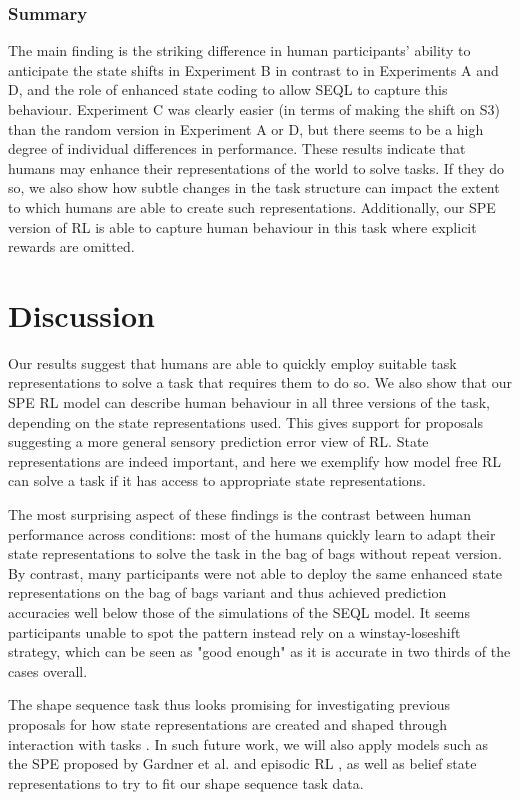 \documentclass[10pt,letterpaper]{article}
\begin{document}
\subsubsection{Summary} The main finding is the striking difference in human participants' ability to anticipate the state shifts in Experiment B in contrast to in Experiments A and D, and the role of enhanced state coding to allow SEQL to capture this behaviour. Experiment C was clearly easier (in terms of making the shift on S3) than the random version in Experiment A or D, but there seems to be a high degree of individual differences in performance. These results indicate that humans may enhance their representations of the world to solve tasks. If they do so, we also show how subtle changes in the task structure can impact the extent to which humans are able to create such representations. Additionally, our SPE version of RL is able to capture human behaviour in this task where explicit rewards are omitted.

\section{Discussion}

Our results suggest that humans are able to quickly employ suitable task representations to solve a task that requires them to do so. We also show that our SPE RL model can describe human behaviour in all three versions of the task, depending on the state representations used. This gives support for proposals suggesting a more general sensory prediction error view of RL. State representations are indeed important, and here we exemplify how model free RL can solve a task if it has access to appropriate state representations.

The most surprising aspect of these findings is the contrast between human performance across conditions: most of the humans quickly learn to adapt their state representations to solve the task in the bag of bags without repeat version. By contrast, many participants were not able to deploy the same enhanced state representations on the bag of bags variant and thus achieved prediction accuracies well below those of the simulations of the SEQL model. It seems participants unable to spot the pattern instead rely on a winstay-loseshift strategy, which can be seen as "good enough" as it is accurate in two thirds of the cases overall.

The shape sequence task thus looks promising for investigating previous proposals for how state representations are created and shaped through interaction with tasks \cite{Collins2013-cv,Eckstein2020-yi}. In such future work, we will also apply models such as the SPE proposed by Gardner et al. \citeyear{Gardner2018-vj} and episodic RL \cite{Gershman2017-ah}, as well as belief state representations \cite{Schuck2018-ik, Babayan2018-ix} to try to fit our shape sequence task data.
\end{document}
